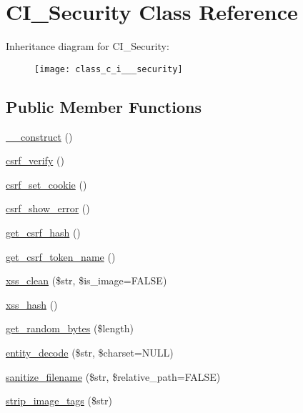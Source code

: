 \hypertarget{class_c_i___security}{}\section{C\+I\+\_\+\+Security Class Reference}
\label{class_c_i___security}
Inheritance diagram for C\+I\+\_\+\+Security\+:\begin{figure}[H]
\begin{center}
\leavevmode
\texttt{[image: class\_c\_i\_\_\_security]}
\end{center}
\end{figure}
\subsection*{Public Member Functions}
\begin{DoxyCompactItemize}
\item 
\hyperlink{class_c_i___security_a095c5d389db211932136b53f25f39685}{\+\_\+\+\_\+construct} ()
\item 
\hyperlink{class_c_i___security_a03c037268db0c2e6221b65a736eaee07}{csrf\+\_\+verify} ()
\item 
\hyperlink{class_c_i___security_a55b1380b93b71ab3d9873bb967c2b9bb}{csrf\+\_\+set\+\_\+cookie} ()
\item 
\hyperlink{class_c_i___security_a3d09c1dc706abfaad987661805c28a06}{csrf\+\_\+show\+\_\+error} ()
\item 
\hyperlink{class_c_i___security_a1644fd8967db3a1b94988d730ca34991}{get\+\_\+csrf\+\_\+hash} ()
\item 
\hyperlink{class_c_i___security_a00640f51b90b7d946e9d3a4f0c9f628e}{get\+\_\+csrf\+\_\+token\+\_\+name} ()
\item 
\hyperlink{class_c_i___security_acb759426dbab128d3d8164805225381c}{xss\+\_\+clean} (\$str, \$is\+\_\+image=F\+A\+L\+S\+E)
\item 
\hyperlink{class_c_i___security_ae2f831d3f277e1c03730b28fd1734186}{xss\+\_\+hash} ()
\item 
\hyperlink{class_c_i___security_a7d1d64e6798b98cb46fcdb304a4e1de2}{get\+\_\+random\+\_\+bytes} (\$length)
\item 
\hyperlink{class_c_i___security_a8bec9918f4d35c9e6340e1dc6a32ba14}{entity\+\_\+decode} (\$str, \$charset=N\+U\+L\+L)
\item 
\hyperlink{class_c_i___security_aaba16489285496bdc03fd12f699a08f6}{sanitize\+\_\+filename} (\$str, \$relative\+\_\+path=F\+A\+L\+S\+E)
\item 
\hyperlink{class_c_i___security_abb836a42971c7bc641588db779c6ab1d}{strip\+\_\+image\+\_\+tags} (\$str)
\end{DoxyCompactItemize}
